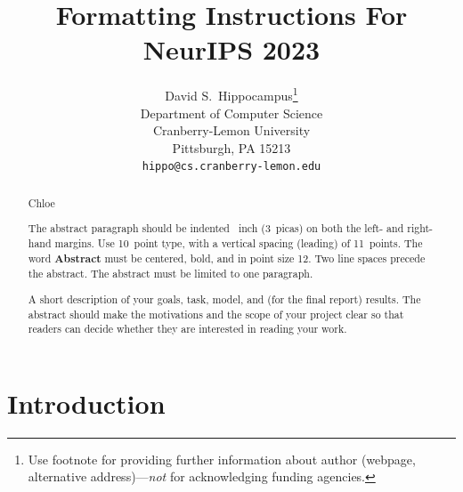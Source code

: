 \documentclass{article}
\title{Formatting Instructions For NeurIPS 2023}
\author{%
  David S.~Hippocampus\thanks{Use footnote for providing further information
    about author (webpage, alternative address)---\emph{not} for acknowledging
    funding agencies.} \\
  Department of Computer Science\\
  Cranberry-Lemon University\\
  Pittsburgh, PA 15213 \\
  \texttt{hippo@cs.cranberry-lemon.edu} \\
}
\begin{document}
\maketitle


\begin{abstract}
  Chloe

  The abstract paragraph should be indented ~inch (3~picas) on
  both the left- and right-hand margins. Use 10~point type, with a vertical
  spacing (leading) of 11~points.  The word \textbf{Abstract} must be centered,
  bold, and in point size 12. Two line spaces precede the abstract. The abstract
  must be limited to one paragraph.

  A short description of your goals, task, model, and (for
the final report) results. The abstract should make the
motivations and the scope of your project clear so that
readers can decide whether they are interested in
reading your work.
\end{abstract}


\section{Introduction}
\end{document}
